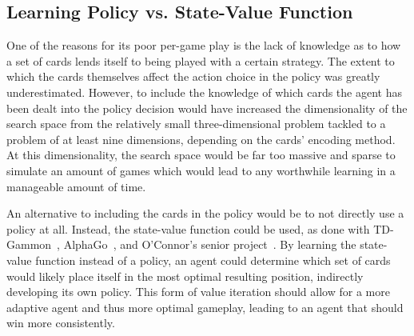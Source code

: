 
\subsection{Learning Policy vs. State-Value Function}
\label{sec:disc-value}


One of the reasons for its poor per-game play
is the lack of knowledge as to how a set of cards lends itself to being played
with a certain strategy.
%
The extent to which the cards themselves affect the action choice in the policy
was greatly underestimated.
%
However,
to include the knowledge of which cards the agent has been dealt into the policy decision
would have increased the dimensionality of the search space from the relatively
small three-dimensional problem tackled to a problem of at least nine
dimensions,
depending on the cards' encoding method.
%
At this dimensionality,
the search space would be far too massive and sparse to simulate an amount of
games which would lead to any worthwhile learning
in a manageable amount of time.

An alternative to including the cards in the policy would be to not
directly use a policy at all.
%
Instead,
the state-value function could be used,
as done with TD-Gammon~\cite{tdgammon},
AlphaGo~\cite{deepmind_alphago,deepmind_alphago_zero},
and O'Connor's senior project~\cite{roconnor_cs486}.
%
By learning the state-value function instead of a policy,
an agent could determine which set of cards would likely place itself in the
most optimal resulting position,
indirectly developing its own policy.
%
This form of value iteration should allow for a more adaptive agent
and thus more optimal gameplay,
leading to an agent that should win more consistently.

%
